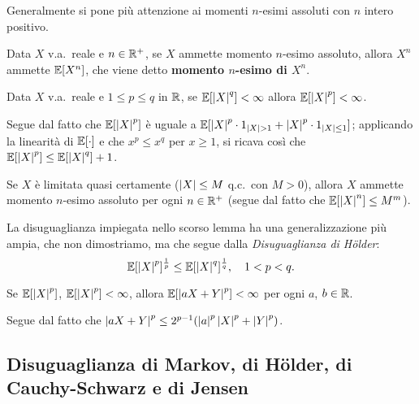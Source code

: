 \begin{multicols*}{2}
\begin{definition}
    Generalmente si pone più attenzione ai momenti $n$-esimi assoluti
    con $n$ intero positivo.
\end{definition}

\begin{definition}
    Data $X$ v.a.~reale e $n \in \mathbb{R}^+$, se $X$ ammette
    momento $n$-esimo assoluto, allora $X^n$ ammette
    $\mathbb{E}[X^n]$, che viene detto \textbf{momento $n$-esimo di $X^n$}.
\end{definition}

\begin{lemma}
    Data $X$ v.a.~reale e $1 \leq p \leq q$ in $\mathbb{R}$,
    se $\mathbb{E}[\left\lvert X \right\rvert^q] < \infty$ allora
    $\mathbb{E}[\left\lvert X \right\rvert^p] < \infty$. \smallskip

    Segue dal fatto che $\mathbb{E}[\left\lvert X \right\rvert^p]$ è uguale
    a $\mathbb{E}[\left\lvert X \right\rvert^p \cdot 1_{{\left\lvert X \right\rvert> 1}} + \left\lvert X \right\rvert^p \cdot 1_{{\left\lvert X \right\rvert \leq 1}}]$;
    applicando la linearità di $\mathbb{E}[\cdot]$ e che $x^p \leq x^q$ per $x \geq 1$, si
    ricava così che $\mathbb{E}[\left\lvert X \right\rvert^p] \leq \mathbb{E}[\left\lvert X \right\rvert^q] + 1$.
\end{lemma}

\begin{remark}
    Se $X$ è limitata quasi certamente ($\left\lvert X \right\rvert \leq M$ q.c.~con $M > 0$),
    allora $X$ ammette momento $n$-esimo assoluto per ogni $n \in \mathbb{R}^+$
    (segue dal fatto che $\mathbb{E}[\left\lvert X \right\rvert^n] \leq M^m$).
\end{remark}

\begin{remark}
    La disuguaglianza impiegata nello scorso lemma ha una generalizzazione
    più ampia, che non dimostriamo, ma che segue dalla \textit{Disuguaglianza di Hölder}:
    \[
        \mathbb{E}[\left\lvert X \right\rvert^p]^{\frac{1}{p}} \leq \mathbb{E}[\left\lvert X \right\rvert^q]^{\frac{1}{q}}, \quad 1 < p < q.
    \]
\end{remark}

\begin{lemma}
    Se $\mathbb{E}[\left\lvert X \right\rvert^p]$, $\mathbb{E}[\left\lvert X \right\rvert^p] < \infty$, allora
    $\mathbb{E}[\left\lvert aX+Y \right\rvert^p] < \infty$ per ogni $a$, $b \in \mathbb{R}$. \smallskip

    Segue dal fatto che $\left\lvert aX+Y \right\rvert^p \leq 2^{p-1} (\left\lvert a \right\rvert^p \left\lvert X \right\rvert^p + \left\lvert Y \right\rvert^p)$.
\end{lemma}

\subsection{Disuguaglianza di Markov, di Hölder, di Cauchy-Schwarz e di Jensen}


\end{multicols*}
